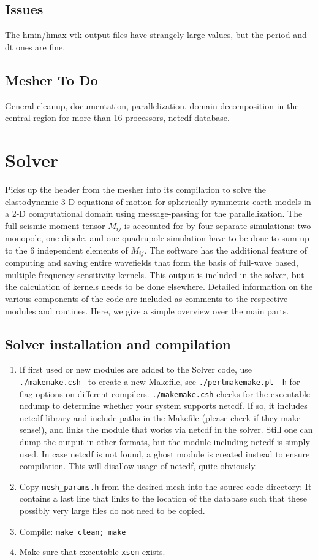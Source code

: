 \documentclass[11pt,letter,fleqn,english,notitlepage]{article}
\begin{document}
\subsection{Issues}
The hmin/hmax vtk output files have strangely large values, but the period and dt ones are fine.

\subsection{Mesher To Do}
General cleanup, documentation, parallelization, domain decomposition in the central region for 
more than 16 processors, netcdf database.

\newpage
\section{Solver}
Picks up the header from the mesher into its compilation to solve 
the elastodynamic 3-D equations of motion for spherically symmetric 
earth models in a 2-D computational domain using message-passing for the 
parallelization. The full seismic moment-tensor $M_{ij}$ is accounted for by four
separate simulations: two monopole, one dipole, and one quadrupole 
simulation have to be done to sum up to the 6 independent elements of $M_{ij}$.
The software has the additional feature of computing and 
saving entire wavefields that form the basis of full-wave based, 
multiple-frequency sensitivity kernels. This output is included in the 
solver, but the calculation of kernels needs to be done elsewhere. 
Detailed information on the various components of the code are included as 
comments to the respective modules and routines. 
Here, we give a simple overview over the main parts. 
\newpage
\subsection{Solver installation and compilation}
\begin{enumerate}
\item If first used or new modules are added to the Solver code,
use {\tt ./makemake.csh } to create a new Makefile, see {\tt ./perlmakemake.pl -h} for 
flag options on different compilers. {\tt ./makemake.csh} checks for the
executable ncdump to determine whether your system supports netcdf. If
so, it includes netcdf library and include paths in the Makefile
(please check if they make sense!), and links the module that works
via netcdf in the solver. Still one can dump the output in other
formats, but the module including netcdf is simply used. In case
netcdf is not found, a ghost module is created instead to ensure
compilation. This will disallow usage of netcdf, quite obviously.
\item Copy {\tt mesh\_params.h} from the desired mesh into the source code directory: 
It contains a last line that links to the location of the database such that 
these possibly very large files do not need to be copied. 
\item Compile: {\tt make clean; make}
\item Make sure that executable {\tt xsem} exists.
\end{enumerate}
\end{document}
